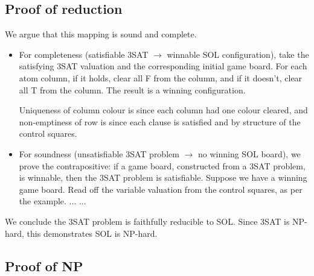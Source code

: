 \documentclass[a4paper]{article}
\begin{document}
\subsection*{Proof of reduction}
We argue that this mapping is sound and complete.
\begin{itemize}
  \item For completeness (satisfiable 3SAT $\longrightarrow$ winnable SOL configuration),
    take the satisfying 3SAT valuation and the corresponding
    initial game board.
    For each atom column, if it holds, clear all F from the column, and if it doesn't, clear all T from the column.
    The result is a winning configuration.

    Uniqueness of column colour is since each column had one colour cleared,
    and non-emptiness of row is since each clause is satisfied and by structure
    of the control squares.

  \item For soundness
    (unsatisfiable 3SAT problem $\longrightarrow$ no winning SOL board),
    we prove the contrapositive:
    if a game board, constructed from a 3SAT problem, is winnable, then 
    the 3SAT problem is satisfiable. 
    Suppose we have a winning game board.
    Read off the variable valuation from the control squares, as per the example.
    ... ...

\end{itemize}
We conclude the 3SAT problem is faithfully reducible to SOL.
Since 3SAT is NP-hard, this demonstrates SOL is NP-hard.

\subsection*{Proof of NP}
\end{document}

